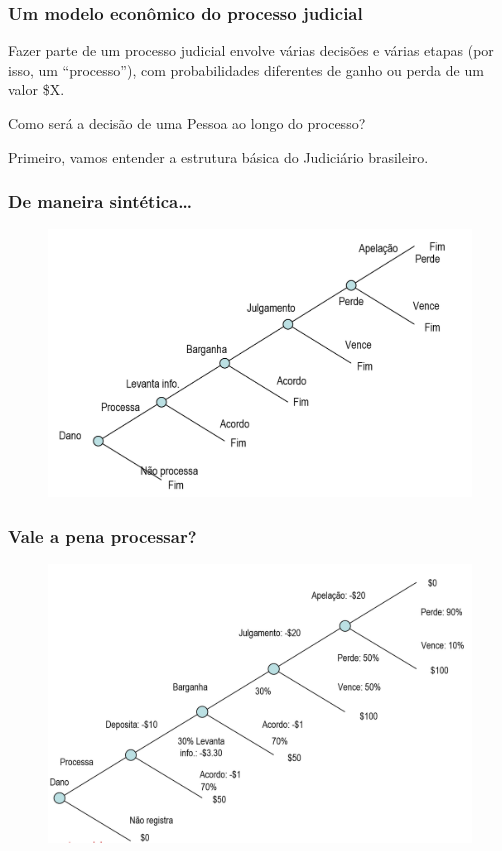 \documentclass[a4paper,12pt]{article}[abntex2]
\begin{document}
\subsubsection{\textbf{Um modelo econômico do processo judicial}}
Fazer parte de um processo judicial envolve várias decisões e várias etapas (por isso, um “processo”), com probabilidades diferentes de ganho ou perda de um valor \$X.

Como será a decisão de uma Pessoa ao longo do processo?

Primeiro, vamos entender a estrutura básica do Judiciário brasileiro.

\subsubsection{\textbf{De maneira sintética…}}
\begin{figure}[H]
    \centering
    \includegraphics[width=0.7\linewidth]{Imagens/a12i1.png}
\end{figure}

\subsubsection{\textbf{Vale a pena processar?}}
\begin{figure}[H]
    \centering
    \includegraphics[width=0.7\linewidth]{Imagens/a12i2.png}
\end{figure}
\end{document}
